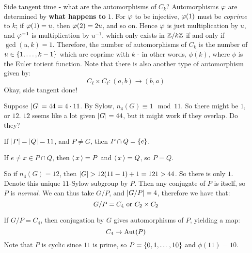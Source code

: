 Side tangent time - what are the automorphisms of $ C_{k} $? \vsp
%
Automorphisms $ \operatorname{\varphi} $ are determined by \textbf{what happens to} $ 1 $.
For $ \operatorname{\varphi} $ to be injective, $ \operatorname{\varphi}(1) $ must be \textit{coprime} to $ k $;
if $ \operatorname{\varphi}(1) = u $, then $ \operatorname{\varphi}(2) = 2u $, and so on.
Hence $ \operatorname{\varphi} $ is just multiplication by $ u $,
and $ \operatorname{\varphi}^{-1} $ is multiplication by $ u^{-1} $, which only exists in $ \mathbb{Z}/k\mathbb{Z} $
if and only if $ \gcd(u, k) = 1 $.
Therefore, the number of automorphisms of $ C_{k} $ is the number of $ u \in \left\{{1, \dots, k-1}\right\} $
which are coprime with $ k $ - in other words, $ \phi(k) $, where $ \phi $ is the Euler totient
function. Note that there is also another type of automorphism given by:
\begin{equation*}
    C_{\ell} \times C_{\ell} : (a, b) \rightarrow (b, a)
\end{equation*}
Okay, side tangent done!

\newpage
Suppose $ \abs{G} = 44 = 4 \cdot 11 $. By Sylow, $ n_{4}(G) \equiv 1 \mod 11 $.
So there might be $ 1 $, or $ 12 $. $ 12 $ seems like a lot given $ \abs{G} = 44 $, but it
might work if they overlap. Do they?

\begin{crll}
    If $ \abs{P} = \abs{Q} = 11 $, and $ P \neq G $, then $ P \cap Q = \left\{{e}\right\} $.
\end{crll}

\begin{pf}[source=Primary Source Material]
    If $ e \neq x \in P \cap Q $, then $ \operatorname{\langle} x \operatorname{\rangle} = P $ and $ \operatorname{\langle} x \operatorname{\rangle} = Q $, so $ P = Q $.
\end{pf}

So if $ n_{4}(G) = 12 $, then $ \abs{G} > 12(11 - 1) + 1 = 121 > 44 $.
So there is only $ 1 $. Denote this unique $ 11 $-Sylow subgroup by $ P $.
Then any conjugate of $ P $ is itself, so $ P $ is \textit{normal}.
We can thus take $ G/P $, and $ \abs{G/P} = 4 $, therefore we have that:
\begin{equation*}
    G/P = C_{4} \textrm{ or } C_{2} \times C_{2}
\end{equation*}

If $ G/P = C_{4} $, then conjugation by $ G $ gives automorphisms of $ P $, yielding a map:
\begin{equation*}
    C_{4} \rightarrow \operatorname{Aut}(P)
\end{equation*}
Note that $ P $ is cyclic since $ 11 $ is prime, so $ P = \left\{{0, 1, \dots, 10}\right\} $
and $ \phi(11) = 10 $.


